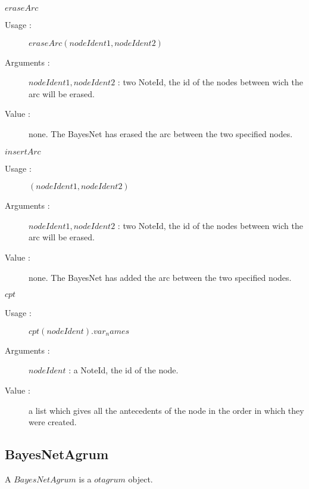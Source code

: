 \begin{description}
\begin{description}
   \item $eraseArc$
    \begin{description}
    \item[Usage :]  $eraseArc(nodeIdent1, nodeIdent2)$
    \item[Arguments :] $nodeIdent1, nodeIdent2$ : two NoteId, the id of the nodes between wich the arc will be erased.
    \item[Value :] none. The BayesNet has erased the arc between the two specified nodes.
    \end{description}
    \bigskip

   \item $insertArc$
    \begin{description}
    \item[Usage :]  $(nodeIdent1, nodeIdent2)$
    \item[Arguments :] $nodeIdent1, nodeIdent2$ : two NoteId, the id of the nodes between wich the arc will be erased.
    \item[Value :]  none. The BayesNet has added the arc between the two specified nodes.
    \end{description}
    \bigskip


  \item $cpt$
    \begin{description}
    \item[Usage :]  $cpt(nodeIdent).var_names$
    \item[Arguments :] $nodeIdent$ : a NoteId, the id of the node.
    \item[Value :]  a list which gives all the antecedents of the node in the order in which they were created.
    \end{description}

  \end{description}


\end{description}





\newpage \subsection{BayesNetAgrum}

A  $BayesNetAgrum$ is a $otagrum$ object.

